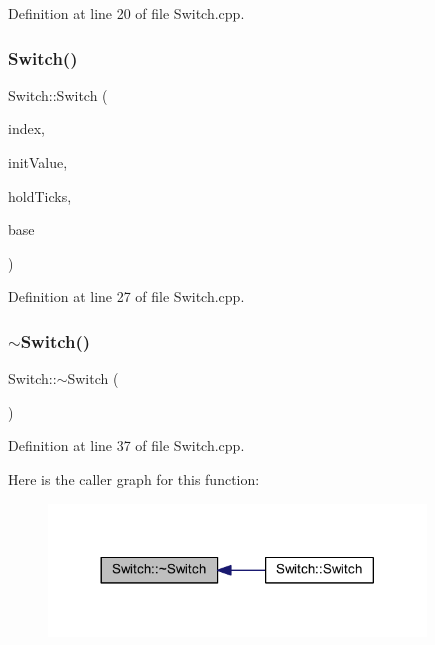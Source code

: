 Definition at line 20 of file Switch.\+cpp.

\mbox{\label{class_switch_aeccf02d441097b52da2f6b0ee16c7acd}} 
\subsubsection{\texorpdfstring{Switch()}{Switch()}\hspace{0.1cm}{\footnotesize\ttfamily [3/3]}}
{\footnotesize\ttfamily Switch\+::\+Switch (\begin{DoxyParamCaption}\item[{unsigned char}]{index,  }\item[{unsigned char}]{init\+Value,  }\item[{unsigned int}]{hold\+Ticks,  }\item[{\hyperlink{class_switch_base}{Switch\+Base} $\ast$}]{base }\end{DoxyParamCaption})}



Definition at line 27 of file Switch.\+cpp.

\mbox{\label{class_switch_ac9e0d5810af5ea21572d5dd7248baed8}} 
\subsubsection{\texorpdfstring{$\sim$\+Switch()}{~Switch()}}
{\footnotesize\ttfamily Switch\+::$\sim$\+Switch (\begin{DoxyParamCaption}{ }\end{DoxyParamCaption})}



Definition at line 37 of file Switch.\+cpp.

Here is the caller graph for this function\+:
\nopagebreak
\begin{figure}[H]
\begin{center}
\leavevmode
\includegraphics[width=284pt]{class_switch_ac9e0d5810af5ea21572d5dd7248baed8_icgraph}
\end{center}
\end{figure}


